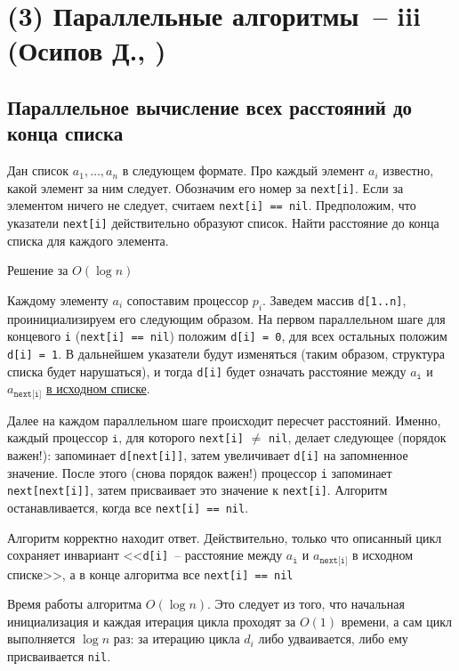 \section{(3) Параллельные алгоритмы~-- iii (Осипов Д., \groth)}
\subsection{Параллельное вычисление всех расстояний до конца списка}
\begin{problem*}
Дан список $a_1, \ldots, a_n$  в следующем формате. Про каждый элемент $a_i$ известно, какой элемент за ним следует. Обозначим его номер за \texttt{next[i]}. Если за элементом ничего не следует, считаем \texttt{next[i] == nil}. Предположим, что указатели \texttt{next[i]} действительно образуют список. Найти расстояние до конца списка для каждого элемента.
\end{problem*}
\begin{algodescription}{Решение за $O(\log n)$}

Каждому элементу $a_i$ сопоставим процессор $p_i$. Заведем массив \texttt{d[1..n]}, проинициализируем его следующим образом. На первом параллельном шаге для концевого \texttt{i} (\texttt{next[i] == nil}) положим \texttt{d[i] = 0}, для всех остальных положим \texttt{d[i] = 1}. В дальнейшем указатели будут изменяться (таким образом, структура списка будет нарушаться), и тогда \texttt{d[i]} будет означать расстояние между $a_\texttt{i}$ и $a_{\texttt{next[i]}}$ \underline{в исходном списке}.

Далее на каждом параллельном шаге происходит пересчет расстояний. Именно, каждый процессор $\mathtt i$, для которого \texttt{next[i]} $\neq$ \texttt{nil}, делает следующее (порядок важен!): запоминает \texttt{d[next[i]]}, затем увеличивает \texttt{d[i]} на запомненное значение. После этого (снова порядок важен!) процессор \texttt{i} запоминает \texttt{next[next[i]]}, затем присваивает это значение к \texttt{next[i]}. Алгоритм останавливается, когда все \texttt{next[i] == nil}.

Алгоритм корректно находит ответ. Действительно, только что описанный цикл сохраняет инвариант <<\texttt{d[i]}~-- расстояние между $a_\texttt{i}$ и $a_\texttt{next[i]}$ в исходном списке>>, а в конце алгоритма все \texttt{next[i] == nil}

Время работы алгоритма $O(\log n)$. Это следует из того, что начальная инициализация и каждая итерация цикла проходят за $O(1)$ времени, а сам цикл выполняется $\log n$ раз: за итерацию цикла $d_i$ либо удваивается, либо ему присваивается \texttt{nil}.  
\end{algodescription}

